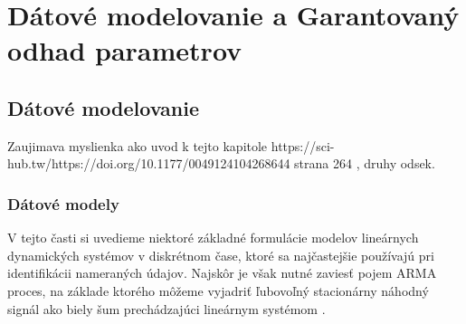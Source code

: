 \part{Dátové modelovanie a Garantovaný odhad parametrov}
\chapter{Dátové modelovanie}
Zaujimava myslienka ako uvod  k tejto kapitole 
https://sci-hub.tw/https://doi.org/10.1177/0049124104268644
strana 264 , druhy odsek.


\section{Dátové modely}
V tejto časti si uvedieme niektoré základné formulácie modelov lineárnych dynamických systémov v diskrétnom čase, ktoré sa najčastejšie používajú pri identifikácii nameraných údajov. Najskôr je však nutné zaviesť pojem ARMA proces, na základe ktorého môžeme vyjadriť ľubovoľný stacionárny náhodný signál ako biely šum prechádzajúci lineárnym systémom \cite{fikar:identifikacia:1999}.

